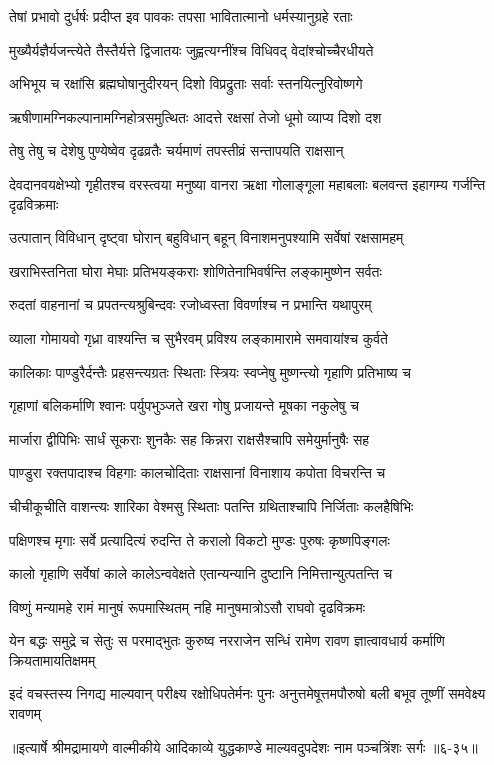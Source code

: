 \twolineshloka
{तेषां प्रभावो दुर्धर्षः प्रदीप्त इव पावकः}
{तपसा भावितात्मानो धर्मस्यानुग्रहे रताः} %

\twolineshloka
{मुख्यैर्यज्ञैर्यजन्त्येते तैस्तैर्यत्ते द्विजातयः}
{जुह्वत्यग्नींश्च विधिवद् वेदांश्चोच्चैरधीयते} %

\twolineshloka
{अभिभूय च रक्षांसि ब्रह्मघोषानुदीरयन्}
{दिशो विप्रद्रुताः सर्वाः स्तनयित्नुरिवोष्णगे} %

\twolineshloka
{ऋषीणामग्निकल्पानामग्निहोत्रसमुत्थितः}
{आदत्ते रक्षसां तेजो धूमो व्याप्य दिशो दश} %

\twolineshloka
{तेषु तेषु च देशेषु पुण्येष्वेव दृढव्रतैः}
{चर्यमाणं तपस्तीव्रं सन्तापयति राक्षसान्} %

\threelineshloka
{देवदानवयक्षेभ्यो गृहीतश्च वरस्त्वया}
{मनुष्या वानरा ऋक्षा गोलाङ्गूला महाबलाः}
{बलवन्त इहागम्य गर्जन्ति दृढविक्रमाः} %

\twolineshloka
{उत्पातान् विविधान् दृष्ट्वा घोरान् बहुविधान् बहून्}
{विनाशमनुपश्यामि सर्वेषां रक्षसामहम्} %

\twolineshloka
{खराभिस्तनिता घोरा मेघाः प्रतिभयङ्कराः}
{शोणितेनाभिवर्षन्ति लङ्कामुष्णेन सर्वतः} %

\twolineshloka
{रुदतां वाहनानां च प्रपतन्त्यश्रुबिन्दवः}
{रजोध्वस्ता विवर्णाश्च न प्रभान्ति यथापुरम्} %

\twolineshloka
{व्याला गोमायवो गृध्रा वाश्यन्ति च सुभैरवम्}
{प्रविश्य लङ्कामारामे समवायांश्च कुर्वते} %

\twolineshloka
{कालिकाः पाण्डुरैर्दन्तैः प्रहसन्त्यग्रतः स्थिताः}
{स्त्रियः स्वप्नेषु मुष्णन्त्यो गृहाणि प्रतिभाष्य च} %

\twolineshloka
{गृहाणां बलिकर्माणि श्वानः पर्युपभुञ्जते}
{खरा गोषु प्रजायन्ते मूषका नकुलेषु च} %

\twolineshloka
{मार्जारा द्वीपिभिः सार्धं सूकराः शुनकैः सह}
{किन्नरा राक्षसैश्चापि समेयुर्मानुषैः सह} %

\twolineshloka
{पाण्डुरा रक्तपादाश्च विहगाः कालचोदिताः}
{राक्षसानां विनाशाय कपोता विचरन्ति च} %

\twolineshloka
{चीचीकूचीति वाशन्त्यः शारिका वेश्मसु स्थिताः}
{पतन्ति ग्रथिताश्चापि निर्जिताः कलहैषिभिः} %

\twolineshloka
{पक्षिणश्च मृगाः सर्वे प्रत्यादित्यं रुदन्ति ते}
{करालो विकटो मुण्डः पुरुषः कृष्णपिङ्गलः} %

\twolineshloka
{कालो गृहाणि सर्वेषां काले कालेऽन्ववेक्षते}
{एतान्यन्यानि दुष्टानि निमित्तान्युत्पतन्ति च} %

\twolineshloka
{विष्णुं मन्यामहे रामं मानुषं रूपमास्थितम्}
{नहि मानुषमात्रोऽसौ राघवो दृढविक्रमः} %

\threelineshloka
{येन बद्धः समुद्रे च सेतुः स परमाद्भुतः}
{कुरुष्व नरराजेन सन्धिं रामेण रावण}
{ज्ञात्वावधार्य कर्माणि क्रियतामायतिक्षमम्} %

\twolineshloka
{इदं वचस्तस्य निगद्य माल्यवान् परीक्ष्य रक्षोधिपतेर्मनः पुनः}
{अनुत्तमेषूत्तमपौरुषो बली बभूव तूष्णीं समवेक्ष्य रावणम्} %


॥इत्यार्षे श्रीमद्रामायणे वाल्मीकीये आदिकाव्ये युद्धकाण्डे माल्यवदुपदेशः नाम पञ्चत्रिंशः सर्गः ॥६-३५॥
